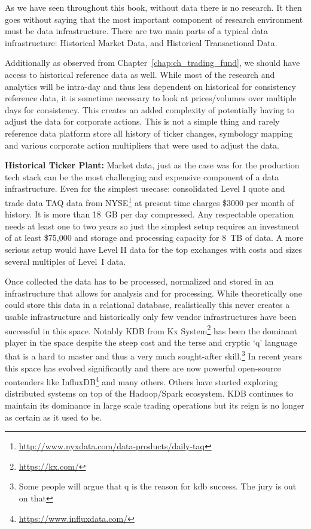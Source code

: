 As we have seen throughout this book, without data there is no research. It then goes without saying that the most important component of research environment must be data infrastructure. There are two main parts of a typical data infrastructure: Historical Market Data, and Historical Transactional Data. 


Additionally as observed from Chapter~\ref{chap:ch_trading_fund}, we should have access to historical reference data as well. While most of the research and analytics will be intra-day and thus less dependent on historical for consistency reference data, it is sometime necessary to look at prices/volumes over multiple days for consistency. This creates an added complexity of potentially having to adjust the data for corporate actions. This is not a simple thing and rarely reference data platform store all history of ticker changes, symbology mapping and various corporate action multipliers that were used to adjust the data. \twomedskip


\noindent\textbf{Historical Ticker Plant:} Market data, just as the case was for the production tech stack can be the most challenging and expensive component of a data infrastructure. Even for  the simplest usecase: consolidated Level I quote and trade data TAQ data from NYSE\footnote{\url{http://www.nyxdata.com/data-products/daily-taq}} at present time charges \$3000 per month of history. It is more than 18~GB per day compressed. Any respectable operation needs at least one to two years so just the simplest setup requires an investment of at least \$75,000 and storage and processing capacity for 8~TB of data. A more serious setup would have Level II data for the top exchanges with costs and sizes several multiples of Level~I data.  


Once collected the data has to be processed, normalized and stored in an infrastructure that allows for analysis and for processing. While theoretically one could store this data in a relational database, realistically this never creates a usable infrastructure and historically only few vendor infrastructures have been successful in this space. Notably KDB from Kx System\footnote{\url{https://kx.com/}} has been the dominant player in the space despite the steep cost and the terse and cryptic `q' language that is a hard to master and thus a very much sought-after skill.\footnote{Some people will argue that q is the reason for kdb success. The jury is out on that} In recent years this space has evolved significantly and there are now powerful open-source contenders like InfluxDB\footnote{\url{https://www.influxdata.com/}} and many others. Others have started exploring distributed systems on top of the Hadoop/Spark ecosystem. KDB continues to maintain its dominance in large scale trading operations but its reign is no longer as certain as it used to be.


